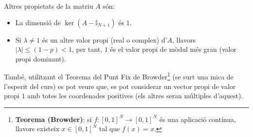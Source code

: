 \documentclass[a4paper, 12pt]{article}
\begin{document}
    \noindent Altres propietats de la matriu $A$ són:
    \begin{itemize}
        \item La dimensió de $\ker(A-\mathbb{I}_{N+1})$ és $1$.
        \item Si $\lambda \neq 1$ és un altre valor propi (real o complex) d'$A$, llavors $|\lambda| \leq (1 - p) < 1$,
        per tant, $1$ és el valor propi de mòdul més gran (valor propi dominant).
    \end{itemize}
    També, utilitzant el Teorema del Punt Fix de Browder\footnote{\textbf{Teorema (Browder)}: si $f : [0, 1]^N \rightarrow [0, 1]^N$
    és una aplicació contínua, llavors existeix $x \in [0, 1]^N$ tal que $f(x) = x$.} (se surt una
    mica de l'esperit del curs) es pot veure que, es pot considerar un vector propi de valor propi $1$
    amb totes les coordenades positives (els altres seran múltiples d'aquest).
\end{document}
